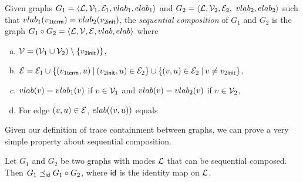 \begin{definition}
\label{def:seq-comp}
Given graphs $G_1 = \langle {\mathcal L}, {\mathcal V}_1, {\mathcal E}_1, {\sc vlab}_1, {\sc elab}_1
\rangle$ and $G_2 = \langle {\mathcal L}, {\mathcal V}_2, {\mathcal E}_2,$ ${\sc vlab}_2, {\sc elab}_2
\rangle$ such that ${\sc vlab}_1(v_{1 {\sf term}}) = {\sc vlab}_2(v_{2
  {\sf init}})$, the \emph{sequential composition} of $G_1$ and $G_2$
is the graph $G_1\circ G_2 = \langle {\mathcal L}, {\mathcal V}, {\mathcal E}, {\sc vlab}, {\sc elab}
\rangle$ where
\begin{enumerate}[(a)]
\itemsep0em 
\item ${\mathcal V} = ({\mathcal V}_1 \cup {\mathcal V}_2) \setminus \{v_{2 {\sf init}})\}$,
\item ${\mathcal E} = {\mathcal E}_1 \cup \{(v_{1 {\sf term}},u)\: |\: (v_{2 {\sf
    init}},u) \in {\mathcal E}_2\} \cup \{(v,u) \in {\mathcal E}_2\: |\: v \neq v_{2 {\sf
    init}}\}$,
\item ${\sc vlab}(v) = {\sc vlab}_1(v)$ if $v \in {\mathcal V}_1$ and ${\sc vlab}(v) =
  {\sc vlab}_2(v)$ if $v \in {\mathcal V}_2$,
\item For edge $(v,u) \in {\mathcal E}$, 
${\sc elab}((v,u)) $ equals 
\end{enumerate}
\end{definition}

Given our definition of trace containment between graphs, we can prove
a very simple property about sequential composition.

\begin{proposition}
\label{prop:seqcomp-containment}
Let $G_1$ and $G_2$ be two graphs with modes ${\mathcal L}$ that can be
sequential composed. Then $G_1 \preceq_{{\sf id}} G_1\circ G_2$,
where ${\sf id}$ is the identity map on ${\mathcal L}$.
\end{proposition}

